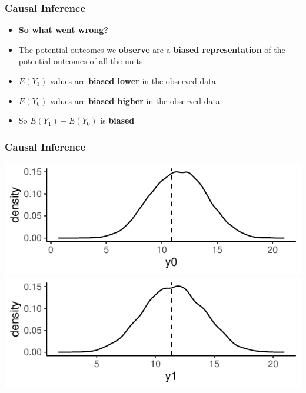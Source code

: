 \documentclass[xcolor=x11names,compress]{beamer}\usepackage[]{graphicx}\usepackage[]{xcolor}
\makeatletter
\def\maxwidth{ %
  \ifdim\Gin@nat@width>\linewidth
    \linewidth
  \else
    \Gin@nat@width
  \fi
}
\newenvironment{knitrout}{}{} %
\renewcommand{\(}{\begin{columns}}
\renewcommand{\)}{\end{columns}}
\newcommand{\<}[1]{\begin{column}{#1}}
\renewcommand{\>}{\end{column}}
\makeatother
\begin{document}
\begin{frame}
\frametitle{Causal Inference}
\begin{itemize}
\item \textbf{So what went wrong?}
\item The potential outcomes we \textbf{observe} are a \textbf{biased representation} of the potential outcomes of all the units
\end{itemize}
\begin{itemize}
\item $E(Y_1)$ values are \textbf{biased lower} in the observed data
\pause
\item $E(Y_0)$ values are \textbf{biased higher} in the observed data
\pause
\item So $E(Y_1)-E(Y_0)$ is \textbf{biased}
\end{itemize}
\end{frame}

\begin{frame}
\frametitle{Causal Inference}
\begin{knitrout}
\color{fgcolor}
\includegraphics[width=\maxwidth]{figure/OVB1a-1} 
\end{knitrout}
\pause
\begin{knitrout}
\color{fgcolor}
\includegraphics[width=\maxwidth]{figure/OVB2a-1} 
\end{knitrout}
\end{frame}
\end{document}
